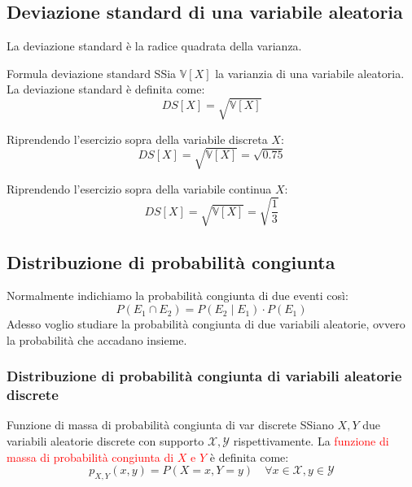 \documentclass{article}  %
\theoremstyle{definition}
\begin{document}
\subsection{Deviazione standard di una variabile aleatoria}
La deviazione standard è la radice quadrata della varianza.
\begin{theorem}{Formula deviazione standard}
	SSia $\mathbb{V}[X]$ la varianzia di una variabile aleatoria. La deviazione standard è definita come:
	\[
		DS\left[X\right]=\sqrt{\mathbb{V}[X]}
	\]
\end{theorem}
\begin{esercizio}[Esercizio 1]
	Riprendendo l'esercizio sopra della variabile discreta $X$:
	\[
		DS\left[X\right]=\sqrt{\mathbb{V}[X]}=\sqrt{0.75}
	\]
\end{esercizio}
\begin{esercizio}[Esercizio 2]
	Riprendendo l'esercizio sopra della variabile continua $X$:
	\[
		DS\left[X\right]=\sqrt{\mathbb{V}[X]}=\sqrt{\frac{1}{3}}
	\]
\end{esercizio}
\subsection{Distribuzione di probabilità congiunta}
Normalmente indichiamo la probabilità congiunta di due eventi così:
\[
	P(E_1 \cap E_2)=P(E_2 \mid E_1) \cdot P(E_1)
\]
Adesso voglio studiare la probabilità congiunta di due variabili aleatorie, ovvero la probabilità che accadano insieme.

\subsubsection{Distribuzione di probabilità congiunta di variabili aleatorie discrete}
\begin{theorem}{Funzione di massa di probabilità congiunta di var discrete}
	SSiano $X,Y$ due variabili aleatorie discrete con supporto $\mathscr{X},\mathscr{Y}$ rispettivamente. La \textcolor{red}{funzione di massa di probabilità congiunta di $X$ e $Y$} è definita come:
	\[
		p_{X,Y}(x,y)=P(X=x,Y=y) \quad \forall{x \in \mathscr{X}, y \in \mathscr{Y}}
	\]
\end{theorem}
\end{document}
